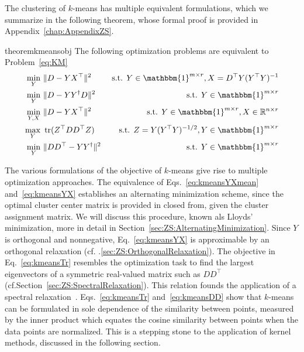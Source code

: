 The clustering of $k$-means has multiple equivalent formulations, which we summarize in the following theorem, whose formal proof is provided in Appendix~\ref{chap:AppendixZS}.
\begin{restatable}{theorem}{kmeansobj}\label{thm:kmeansobj}
The following optimization problems are equivalent to Problem~\eqref{eq:KM}
\begin{align}
\min_{Y}\ &\|D-YX^\top\|^2 &\text{ s.t. } Y\in\mathbbm{1}^{m\times r}, X=D^\top Y(Y^\top Y)^{-1} \label{eq:kmeansYXmean} \\
\min_{Y}\ &\|D-YY^\dagger D\|^2 &\text{ s.t. } Y\in\mathbbm{1}^{m\times r} \label{eq:kmeansYYdaggerD} \\
\min_{Y,X}\ &\|D-YX^\top\|^2 &\text{ s.t. } Y\in\mathbbm{1}^{m\times r}, X\in\mathbb{R}^{n\times r} \label{eq:kmeansYX} \\
\max_{Y}\ &\tr(Z^\top DD^\top Z)&\text{ s.t. } Z= Y(Y^\top Y)^{-1/2}, Y\in\mathbbm{1}^{m\times r} \label{eq:kmeansTr} \\
\min_{Y}\ &\|DD^\top - YY^\dagger\|^2 &\text{ s.t. }   Y\in\mathbbm{1}^{m\times r} \label{eq:kmeansDD}
\end{align}
\end{restatable}
The various formulations of the objective of $k$-means give rise to multiple optimization approaches. The equivalence of Eqs.~\eqref{eq:kmeansYXmean} and~\eqref{eq:kmeansYX} establishes an alternating minimization scheme, since the optimal cluster center matrix is provided in closed from, given the cluster assignment matrix. We will discuss this procedure, known als Lloyds' minimization, more in detail in Section~\ref{sec:ZS:AlternatingMinimization}. Since $Y$ is orthogonal and nonnegative, Eq.~\eqref{eq:kmeansYX} is approximable by an orthogonal relaxation (cf. \@Sec.\ref{sec:ZS:OrthogonalRelaxation}).
The objective in Eq.~\eqref{eq:kmeansTr} resembles the optimization task to find the largest eigenvectors of a symmetric real-valued matrix such as $DD^\top$ (cf.\@ Section~\ref{sec:ZS:SpectralRelaxation}). This relation founds the application of a spectral relaxation~\citep{zha2002spectral}. 
Eqs.~\@\eqref{eq:kmeansTr} and~\@\eqref{eq:kmeansDD} show that $k$-means can be formulated in sole dependence of the similarity between points, measured by the inner product which equates the cosine similarity between points when the data points are normalized. This is a stepping stone to the application of kernel methods, discussed in the following section.


